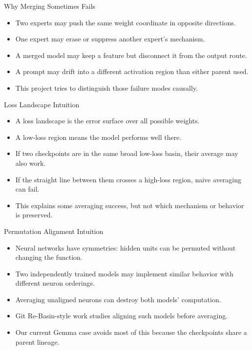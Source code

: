\documentclass[aspectratio=169]{beamer}
\begin{document}
\begin{frame}{Why Merging Sometimes Fails}
\small
\begin{itemize}
  \item Two experts may push the same weight coordinate in opposite directions.
  \item One expert may erase or suppress another expert's mechanism.
  \item A merged model may keep a feature but disconnect it from the output route.
  \item A prompt may drift into a different activation region than either parent used.
  \item This project tries to distinguish those failure modes causally.
\end{itemize}
\end{frame}

\begin{frame}{Loss Landscape Intuition}
\small
\begin{itemize}
  \item A loss landscape is the error surface over all possible weights.
  \item A low-loss region means the model performs well there.
  \item If two checkpoints are in the same broad low-loss basin, their average may also work.
  \item If the straight line between them crosses a high-loss region, naive averaging can fail.
  \item This explains some averaging success, but not which mechanism or behavior is preserved.
\end{itemize}
\end{frame}

\begin{frame}{Permutation Alignment Intuition}
\small
\begin{itemize}
  \item Neural networks have symmetries: hidden units can be permuted without changing the function.
  \item Two independently trained models may implement similar behavior with different neuron orderings.
  \item Averaging unaligned neurons can destroy both models' computation.
  \item Git Re-Basin-style work studies aligning such models before averaging.
  \item Our current Gemma case avoids most of this because the checkpoints share a parent lineage.
\end{itemize}
\end{frame}
\end{document}
